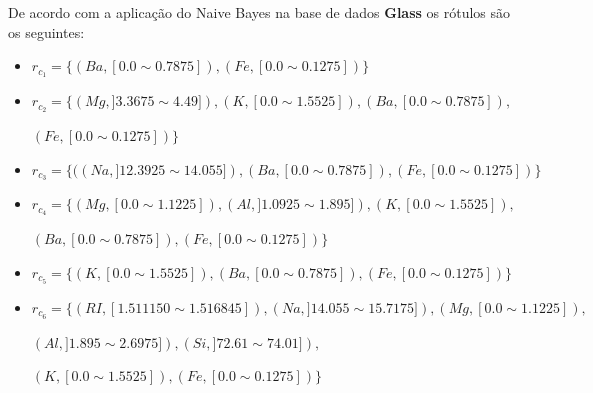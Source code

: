 %         
%         
% 
% 



De acordo com a aplicação do Naive Bayes na base de dados \textbf{Glass} os rótulos são os seguintes:
\begin{itemize}[noitemsep]
 \item ${r_{c_1}=\{ (Ba,[ 0.0 \sim 0.7875 ] ),(Fe,[ 0.0 \sim 0.1275 ] ) \} }$  
 \item ${r_{c_2}=\{ (Mg,] 3.3675 \sim  4.49 ] ),(K,[ 0.0 \sim 1.5525 ] ),(Ba,[ 0.0 \sim 0.7875 ] ),}$
 
 ${(Fe,[ 0.0 \sim 0.1275 ] ) \} }$
 \item ${r_{c_3}=\{ ((Na,]12.3925 \sim 14.055 ] ),(Ba,[ 0.0 \sim 0.7875 ] ),(Fe,[ 0.0 \sim 0.1275 ] )  \} }$  
 \item ${r_{c_4}=\{ (Mg,[ 0.0 \sim  1.1225 ] ),(Al,] 1.0925 \sim 1.895 ] ), (K,[ 0.0 \sim 1.5525 ] ),}$

 ${ (Ba,[ 0.0 \sim 0.7875 ] ),(Fe,[ 0.0 \sim 0.1275 ] ) \} }$
 \item ${r_{c_5}=\{  (K,[ 0.0 \sim 1.5525 ]  ),(Ba,[ 0.0 \sim 0.7875 ] ), (Fe,[ 0.0 \sim 0.1275 ] )\} }$
 \item ${r_{c_6}=\{ (RI,[ 1.511150 \sim  1.516845  ] ),(Na,]14.055 \sim 15.7175 ] ),  (Mg,[ 0.0 \sim  1.1225  ] ), }$
 
 ${ (Al,] 1.895 \sim 2.6975 ] ), (Si,] 72.61 \sim 74.01 ] ),  }$
 
 ${ (K,[ 0.0 \sim 1.5525] ),(Fe,[ 0.0 \sim 0.1275 ] ) \} }$
\end{itemize}


